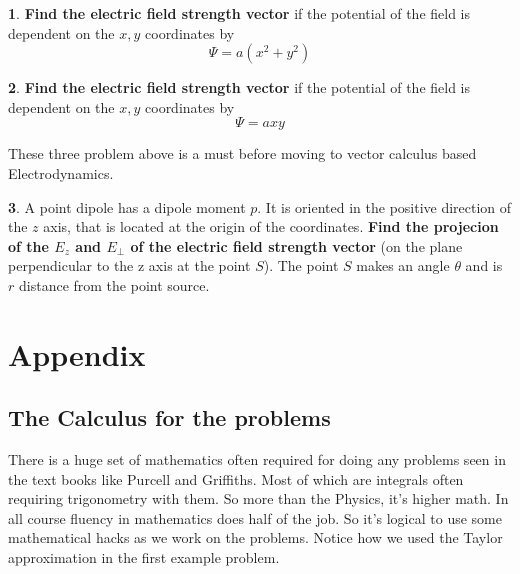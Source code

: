 \documentclass[11pt,a4paper,twocolumn]{article}
\theoremstyle{definition}
\theoremstyle{definition}
\newtheorem{pr}{ \framebox[0.05\textwidth]{Pr} }
\theoremstyle{definition}
\theoremstyle{definition}
\begin{document}
\begin{pr} \label{pr6}
\textbf{Find the electric field strength vector} if the potential of the field is dependent on the $x,y$ coordinates by 
\[ \Psi = a (x^2 + y^2) \]
\end{pr}

\begin{pr} \label{pr7}
\textbf{Find the electric field strength vector} if the potential of the field is dependent on the $x,y$ coordinates by 
\[ \Psi = axy \]
\end{pr}

These three problem above is a must before moving to vector calculus based Electrodynamics.

\begin{pr}
A point dipole has a dipole moment $p$. It is oriented in the positive direction of the $z$ axis, that is located at the origin of the coordinates. \textbf{Find the projecion of the $E_z$ and $E_{\perp}$ of the electric field strength vector} (on the plane perpendicular to the z axis at the point $S$). The point $S$ makes an angle $\theta$ and is $r$ distance from the point source.
\end{pr}













\newpage
\newpage
\section{\small{Appendix}}
\subsection{\small{The Calculus for the problems}}


There is a huge set of mathematics often required for doing any problems seen in the text books like Purcell and Griffiths. Most of which are integrals often requiring trigonometry with them. So more than the Physics, it's higher math. In all course fluency in mathematics does half of the job. So it's logical to use some mathematical hacks as we work on the problems. Notice how we used the Taylor approximation in the first example problem.
\end{document}
